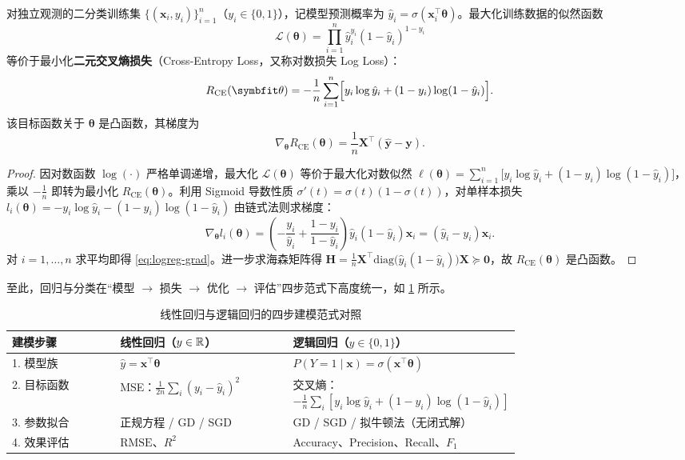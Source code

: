 \begin{theorem}[伯努利极大似然估计与交叉熵等价性]\label{thm:mle-cross-entropy}
对独立观测的二分类训练集 $\{(\bm{x}_i, y_i)\}_{i=1}^{n}$（$y_i\in\{0,1\}$），记模型预测概率为 $\hat{y}_i = \sigma(\bm{x}_i^\top\bm{\theta})$。最大化训练数据的似然函数
\[
  \mathcal{L}(\bm{\theta}) = \prod_{i=1}^{n} \hat{y}_i^{y_i}(1-\hat{y}_i)^{1-y_i}
\]
等价于最小化\textbf{二元交叉熵损失}（Cross-Entropy Loss，又称对数损失 Log Loss）：
\begin{equation}\label{eq:cross-entropy}
  R_{\mathrm{CE}}(\bm{\theta}) = -\frac{1}{n}\sum_{i=1}^{n}\Bigl[y_i\log\hat{y}_i + (1-y_i)\log(1-\hat{y}_i)\Bigr].
\end{equation}
该目标函数关于 $\bm{\theta}$ 是凸函数，其梯度为
\begin{equation}\label{eq:logreg-grad}
  \nabla_{\bm{\theta}}R_{\mathrm{CE}}(\bm{\theta}) = \frac{1}{n}\bm{X}^\top(\hat{\bm{y}} - \bm{y}).
\end{equation}
\end{theorem}

\begin{proof}
因对数函数 $\log(\cdot)$ 严格单调递增，最大化 $\mathcal{L}(\bm{\theta})$ 等价于最大化对数似然 $\ell(\bm{\theta}) = \sum_{i=1}^{n}\bigl[y_i\log\hat{y}_i + (1-y_i)\log(1-\hat{y}_i)\bigr]$，乘以 $-\frac{1}{n}$ 即转为最小化 $R_{\mathrm{CE}}(\bm{\theta})$。利用 Sigmoid 导数性质 $\sigma'(t) = \sigma(t)(1-\sigma(t))$，对单样本损失 $l_i(\bm{\theta}) = -y_i\log\hat{y}_i - (1-y_i)\log(1-\hat{y}_i)$ 由链式法则求梯度：
\[
  \nabla_{\bm{\theta}} l_i(\bm{\theta})
  = \left(-\frac{y_i}{\hat{y}_i} + \frac{1-y_i}{1-\hat{y}_i}\right)\hat{y}_i(1-\hat{y}_i)\bm{x}_i
  = (\hat{y}_i - y_i)\bm{x}_i.
\]
对 $i=1,\dots,n$ 求平均即得 \cref{eq:logreg-grad}。进一步求海森矩阵得 $\bm{H} = \frac{1}{n}\bm{X}^\top \mathrm{diag}\bigl(\hat{y}_i(1-\hat{y}_i)\bigr)\bm{X} \succeq \bm{0}$，故 $R_{\mathrm{CE}}(\bm{\theta})$ 是凸函数。
\end{proof}

至此，回归与分类在“模型 $\to$ 损失 $\to$ 优化 $\to$ 评估”四步范式下高度统一，如 \cref{tab:reg-vs-clf} 所示。

\begin{table}[htbp]
  \centering\small
  \caption{线性回归与逻辑回归的四步建模范式对照}\label{tab:reg-vs-clf}
  \begin{tabular}{@{}l>{\raggedright\arraybackslash}p{0.34\linewidth}>{\raggedright\arraybackslash}p{0.40\linewidth}@{}}
    \toprule
    建模步骤 & 线性回归（$y\in\mathbb{R}$） & 逻辑回归（$y\in\{0, 1\}$） \\
    \midrule
    1. 模型族 & $\hat{y} = \bm{x}^\top\bm{\theta}$ & $\hat{P}(Y=1\mid\bm{x}) = \sigma(\bm{x}^\top\bm{\theta})$ \\
    2. 目标函数 & MSE：$\frac{1}{2n}\sum_{i}(y_i - \hat{y}_i)^2$ & 交叉熵：$-\frac{1}{n}\sum_{i}[y_i\log\hat{y}_i+(1-y_i)\log(1-\hat{y}_i)]$ \\
    3. 参数拟合 & 正规方程 / GD / SGD & GD / SGD / 拟牛顿法（无闭式解） \\
    4. 效果评估 & $\mathrm{RMSE}$、$R^2$ & Accuracy、Precision、Recall、$F_1$ \\
    \bottomrule
  \end{tabular}
\end{table}

